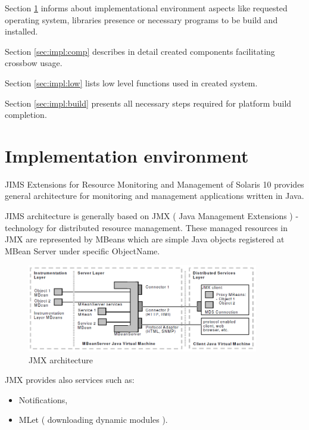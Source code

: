 \documentclass[11pt]{book}
\begin{document}
	Section \ref{sec:impl:env} informs about implementational environment aspects like requested operating system, libraries presence or
	necessary programs to be build and installed. 

    Section \ref{sec:impl:comp} describes in detail created components facilitating crossbow usage.

    Section \ref{sec:impl:low} lists low level functions used in created system.
	
	Section \ref{sec:impl:build} presents all necessary steps required for platform build completion.

    \section{Implementation environment}
	\label{sec:impl:env}
	
		JIMS Extensions for Resource Monitoring and Management of Solaris 10 provides general architecture for monitoring and management
		applications written in Java. 
	
		JIMS architecture is generally based on JMX ( Java Management Extensions ) - technology for distributed resource management. These managed 
		resources in JMX are represented by MBeans which are simple Java objects registered at MBean Server under specific ObjectName. \cite{jims}
	
		\begin{figure}[H]
          \begin{center}
            \includegraphics[width=0.9\textwidth]{img/jims/jmx.png}
          \end{center}
          \caption{JMX architecture \cite{jims}}
		\end{figure}
	
		JMX provides also services such as:
		\begin{itemize}
			\item{Notifications,}
			\item{MLet ( downloading dynamic modules ).}
		\end{itemize}
	
\end{document}
